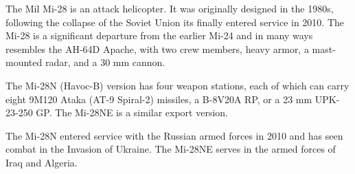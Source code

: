 

The Mil Mi-28 is an attack helicopter. It was originally designed in the 1980s, following the collapse of the Soviet Union its finally entered service in 2010. The Mi-28 is a significant departure from the earlier Mi-24 and in many ways resembles the AH-64D Apache, with two crew members, heavy armor, a mast-mounted radar, and a 30 mm cannon.

The Mi-28N (Havoc-B) version has four weapon stations, each of which can carry eight 9M120 Ataka (AT-9 Spiral-2) missiles, a B-8V20A  RP, or a 23 mm UPK-23-250 GP. The Mi-28NE is a similar export version.

The Mi-28N entered service with the Russian armed forces in 2010 and has seen combat in the Invasion of Ukraine. The Mi-28NE serves in the armed forces of Iraq and Algeria.
